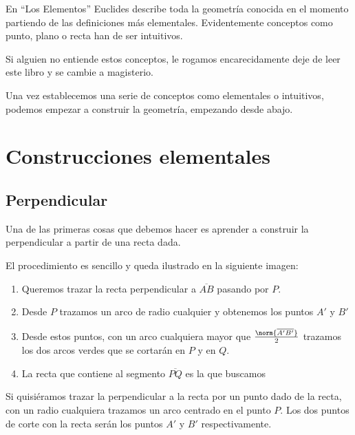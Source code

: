 \documentclass{apuntes}
\begin{document}
En ``Los Elementos'' Euclides describe toda la geometría conocida en el momento partiendo de las definiciones más elementales. Evidentemente conceptos como punto, plano o recta han de ser intuitivos.

Si alguien no entiende estos conceptos, le rogamos encarecidamente deje de leer este libro y se cambie a magisterio.

Una vez establecemos una serie de conceptos como elementales o intuitivos, podemos empezar a construir la geometría, empezando desde abajo.

\section{Construcciones elementales}
\subsection{Perpendicular}
Una de las primeras cosas que debemos hacer es aprender a construir la perpendicular a partir de una recta dada.

El procedimiento es sencillo y queda ilustrado en la siguiente imagen:

\begin{minipage}{0.4\textwidth}
\begin{center}
\end{center}
\end{minipage}
\begin{minipage}{0.57\textwidth}
\begin{enumerate}
\item Queremos trazar la recta perpendicular a $\overline{AB}$ pasando por $P$.
\item Desde $P$ trazamos un arco de radio cualquier y obtenemos los puntos $A'$ y $B'$
\item Desde estos puntos, con un arco cualquiera mayor que $\frac{\norm{\overline{A'B'}}}{2}$ trazamos los dos arcos verdes que se cortarán en $P$ y en $Q$.
\item La recta que contiene al segmento $\overline{PQ}$ es la que buscamos
\end{enumerate}
\end{minipage}

Si quisiéramos trazar la perpendicular a la recta por un punto dado de la recta, con un radio cualquiera trazamos un arco centrado en el punto $P$. Los dos puntos de corte con la recta serán los puntos $A'$ y $B'$ respectivamente.
\end{document}
